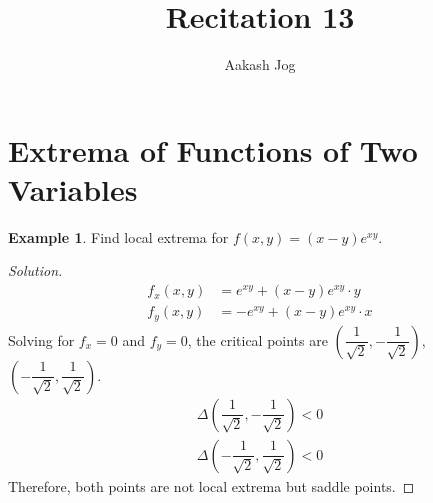 \documentclass[fleqn, 12pt]{article}
\title{Recitation 13}
\author{Aakash Jog}
\date{\formatdate{18}{1}{2015}}
\theoremstyle{definition}
\newtheorem{example}{Example}
\theoremstyle{theorem}
\newenvironment{solution}
{\begin{proof}[Solution]\let\qed\relax}
	{\end{proof}}
\begin{document}
\maketitle

\tableofcontents

\newpage
\section{Extrema of Functions of Two Variables}

\begin{example}
	Find local extrema for $f(x,y) = (x - y) e^{xy}$.
\end{example}

\begin{solution}
	\begin{align*}
		f_x(x,y) &= e^{xy} + (x - y) e^{xy} \cdot y\\
		f_y(x,y) &= -e^{xy} + (x- y) e^{xy} \cdot x
	\end{align*}
	Solving for $f_x = 0$ and $f_y = 0$, the critical points are $\left( \dfrac{1}{\sqrt{2}}, -\dfrac{1}{\sqrt{2}} \right)$, $\left( -\dfrac{1}{\sqrt{2}}, \dfrac{1}{\sqrt{2}} \right)$.
	\begin{align*}
		\Delta \left( \dfrac{1}{\sqrt{2}}, -\dfrac{1}{\sqrt{2}} \right) < 0\\
		\Delta \left( -\dfrac{1}{\sqrt{2}}, \dfrac{1}{\sqrt{2}} \right) < 0
	\end{align*}
	Therefore, both points are not local extrema but saddle points.
\end{solution}
\end{document}
